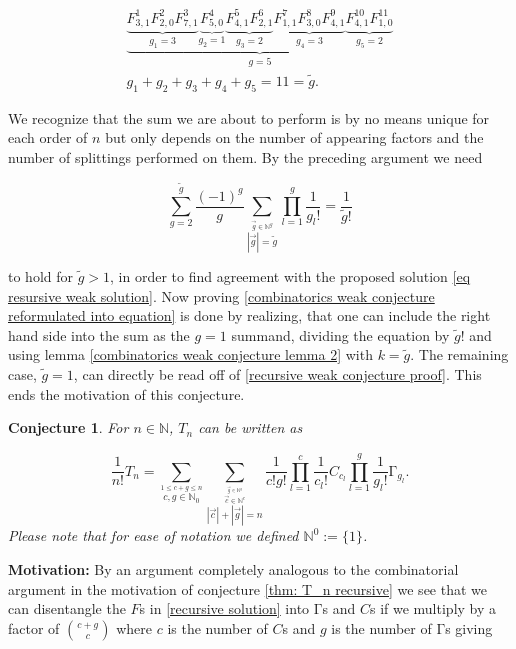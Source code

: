 \documentclass[b5paper,draft,openbib,12pt]{memoir}
\newtheorem{Conj}[Def]{Conjecture}
\begin{document}
\begin{align*}
\underbrace{\underbrace{F^1_{3,1} F^2_{2,0} F^3_{7,1}}_{g_1=3} \underbrace{F^4_{5,0}}_{g_2=1} \underbrace{F^5_{4,1} F^6_{2,1}}_{g_3=2} \underbrace{F^7_{1,1} F^8_{3,0} F^9_{4,1}}_{g_4=3} \underbrace{F^{10}_{4,1} F^{11}_{1,0}}_{g_5=2}}_{g=5}\\
 g_1+g_2+g_3+g_4+g_5=11=\tilde{g}.
\end{align*}

We recognize
that the sum we are about to perform is by no means unique for each order of \(n\) but only 
depends on the number of appearing factors and the number of splittings performed on
them. By the preceding argument we need 

\begin{equation}\label{combinatorics weak conjecture reformulated into equation}
\sum_{g=2}^{\tilde{g}} \frac{(-1)^g}{g} \sum_{\stackrel{\vec{g}\in\mathbb{N}^g}{|\vec{g}|=\tilde{g}}} \prod_{l=1}^g \frac{1}{g_l!}
= \frac{1}{\tilde{g}!} 
\end{equation}


to hold for \(\tilde{g}>1\), in order to find agreement with the proposed solution \eqref{eq resursive weak solution}.
Now proving \eqref{combinatorics weak conjecture reformulated into equation} is done by 
realizing, that one can include the right hand side into the sum as the \(g=1\) summand, dividing
the equation by \(\tilde{g}!\) and using lemma \ref{combinatorics weak conjecture lemma 2}
with \(k=\tilde{g}\). The remaining case, \(\tilde{g}=1\), can directly be
read off of \eqref{recursive weak conjecture proof}. This ends the motivation of this conjecture.

\begin{Conj}\label{Corollary T_n by G's and C's}
For \(n\in\mathbb{N}\), \(T_n\) can be written as

\begin{equation}
\frac{1}{n!} T_n = \sum_{\stackrel{1\le c+g\le n}{c,g\in\mathbb{N}_0}} 
\sum_{\stackrel{\stackrel{\vec{g}\in\mathbb{N}^g}{\vec{c}\in\mathbb{N}^c}}{|\vec{c}| + |\vec{g}|=n}} 
\frac{1}{c! g!} \prod_{l=1}^c \frac{1}{c_l!} C_{c_l} \prod_{l=1}^g \frac{1}{g_l!} \mathrm\Gamma_{g_l}.
\end{equation}
Please note that for ease of notation we defined \(\mathbb{N}^0:= \{1\}\).
\end{Conj}
\textbf{Motivation:} By an argument completely analogous to the combinatorial argument in the motivation of conjecture
\eqref{thm: T_n recursive} we see that we can disentangle the \(F\)s in \eqref{recursive solution}
into \(\mathrm\Gamma\)s and \(C\)s if we multiply by a factor of \(\binom{c+g}{c}\) where \(c\) is the 
number of \(C\)s and \(g\) is the number of \(\mathrm\Gamma\)s giving
\end{document}

